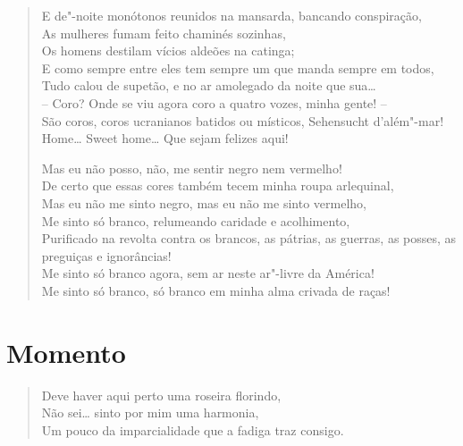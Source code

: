 {\begin{verse}
E de"-noite monótonos reunidos na mansarda, bancando conspiração,\\
As mulheres fumam feito chaminés sozinhas,\\
Os homens destilam vícios aldeões na catinga;\\
E como sempre entre eles tem sempre um que manda sempre em todos,\\
Tudo calou de supetão, e no ar amolegado da noite que sua\ldots{}\\
-- Coro? Onde se viu agora coro a quatro vozes, minha gente! --\\
São coros, coros ucranianos batidos ou místicos, Sehensucht d'além"-mar!\\
Home\ldots{} Sweet home\ldots{} Que sejam felizes aqui!

Mas eu não posso, não, me sentir negro nem vermelho!\\
De certo que essas cores também tecem minha roupa arlequinal,\\
Mas eu não me sinto negro, mas eu não me sinto vermelho,\\
Me sinto só branco, relumeando caridade e acolhimento,\\
Purificado na revolta contra os brancos, as pátrias, as guerras, as posses, as preguiças e ignorâncias!\\
Me sinto só branco agora, sem ar neste ar"-livre da América!\\
Me sinto só branco, só branco em minha alma crivada de raças!
\end{verse}

\chapter[Momento]{Momento }

\begin{verse}
Deve haver aqui perto uma roseira florindo,\\
Não sei\ldots{} sinto por mim uma harmonia,\\
Um pouco da imparcialidade que a fadiga traz consigo.


\end{verse}}
